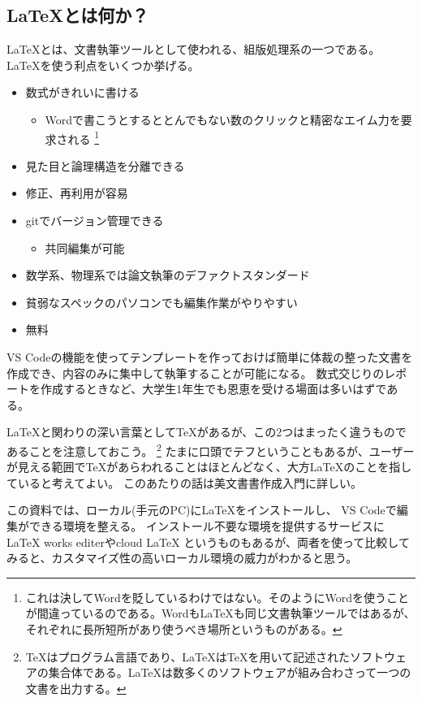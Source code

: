 \documentclass[titlepage]{ltjsarticle}
\begin{document}
\subsection{\LaTeX とは何か？}
\LaTeX とは、文書執筆ツールとして使われる、組版処理系の一つである。
\LaTeX を使う利点をいくつか挙げる。
\begin{itemize}
  \item 数式がきれいに書ける
  \begin{itemize}
    \item Wordで書こうとするととんでもない数のクリックと精密なエイム力を要求される
    \footnote{これは決してWordを貶しているわけではない。そのようにWordを使うことが間違っているのである。Wordも\LaTeX も同じ文書執筆ツールではあるが、それぞれに長所短所があり使うべき場所というものがある。}
  \end{itemize}
  \item 見た目と論理構造を分離できる
  \item 修正、再利用が容易
  \item gitでバージョン管理できる
  \begin{itemize}
    \item 共同編集が可能
  \end{itemize}
  \item 数学系、物理系では論文執筆のデファクトスタンダード
  \item 貧弱なスペックのパソコンでも編集作業がやりやすい
  \item 無料
\end{itemize}
VS Codeの機能を使ってテンプレートを作っておけば簡単に体裁の整った文書を作成でき、内容のみに集中して執筆することが可能になる。
数式交じりのレポートを作成するときなど、大学生1年生でも恩恵を受ける場面は多いはずである。

\LaTeX と関わりの深い言葉として\TeX があるが、この2つはまったく違うものであることを注意しておこう。
\footnote{\TeX \index{\TeX}はプログラム言語であり、\LaTeX は\TeX を用いて記述されたソフトウェアの集合体である。\LaTeX は数多くのソフトウェアが組み合わさって一つの文書を出力する。}
たまに口頭でテフということもあるが、ユーザーが見える範囲で\TeX があらわれることはほとんどなく、大方\LaTeX のことを指していると考えてよい。
このあたりの話は美文書書作成入門\cite{美文書本}に詳しい。

この資料では、ローカル(手元のPC)に\LaTeX をインストールし、
VS Codeで編集ができる環境を整える。
インストール不要な環境を提供するサービスにLaTeX works editerやcloud LaTeX というものもあるが、両者を使って比較してみると、カスタマイズ性の高いローカル環境の威力がわかると思う。
\end{document}
